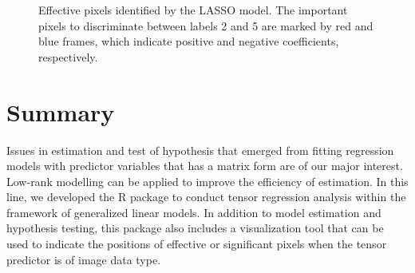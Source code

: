 \begin{Schunk}
\begin{figure}
{}

\caption[Effective pixels identified by the LASSO model]{Effective pixels identified by the LASSO model. The important pixels to discriminate between labels 2 and 5 are marked by red and blue frames, which indicate positive and negative coefficients, respectively.}\label{fig:mnistlasso}
\end{figure}
\end{Schunk}

\hypertarget{summary}{%
\section{Summary}\label{summary}}

Issues in estimation and test of hypothesis that emerged from fitting
regression models with predictor variables that has a matrix form are of
our major interest. Low-rank modelling can be applied to improve the
efficiency of estimation. In this line, we developed the R package
 to conduct tensor regression analysis within the
framework of generalized linear models. In addition to model estimation
and hypothesis testing, this package also includes a visualization tool
that can be used to indicate the positions of effective or significant
pixels when the tensor predictor is of image data type.




\address{%
Ping-Yang Chen\\
Chimes AI\\%
12F., No.~201-8, Dunhua N. Rd., Songshan Dist.,\\ Taipei City 105076,
Taiwan\\
%
%
%
\href{mailto:pychen@chimes.ai}{\nolinkurl{pychen@chimes.ai}}%
}

\address{%
Hsing-Ming Chang\\
Department of Statistics and Institute of Data Science, National Cheng
Kung University\\%
1 University Road,\\ Tainan 70101, Taiwan\\
%
%
%
\href{mailto:nckuhmchang@ncku.edu.tw}{\nolinkurl{nckuhmchang@ncku.edu.tw}}%
}

\address{%
Yu-Ting Chen\\
Department of Statistics, Purdue University\\%
250 N. University St, West Lafayette,\\ IN 47907, United States of
America\\
%
%
%
\href{mailto:l501l501l@gmail.com}{\nolinkurl{l501l501l@gmail.com}}%
}


